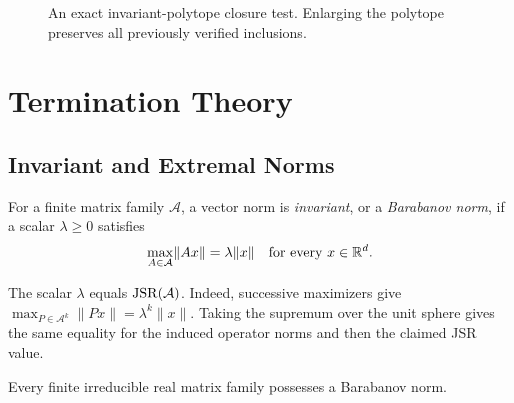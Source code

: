 \begin{figure}[ht]
    \centering
    \caption{An exact invariant-polytope closure test.
    Enlarging the polytope preserves all previously verified inclusions.}
    \label{fig:invPolytopeWorkflow}
\end{figure}

\section{Termination Theory}
\label{sec:invExtremalNorms}

\subsection{Invariant and Extremal Norms}

\begin{definition}\citep{Barabanov1988LyapunovIndicatorDiscreteInclusions}
    \label{def:barabanovNorm}
    For a finite matrix family $\mathcal{A}$, a vector norm is \emph{invariant}, or a \emph{Barabanov norm}, if a scalar $\lambda\geq0$ satisfies
    \[
        \max_{A\in\mathcal{A}}\lVert Ax\rVert=\lambda\lVert x\rVert
        \quad\text{for every }x\in\mathbb{R}^d.
    \]
\end{definition}

The scalar $\lambda$ equals $\operatorname{JSR}(\mathcal{A})$.
Indeed, successive maximizers give $\max_{P\in\mathcal{A}^k}\lVert Px\rVert=\lambda^k\lVert x\rVert$.
Taking the supremum over the unit sphere gives the same equality for the induced operator norms and then the claimed JSR value.

\begin{theorem}\citep{Barabanov1988LyapunovIndicatorDiscreteInclusions}
    \label{thm:barabanovNormExistence}
    Every finite irreducible real matrix family possesses a Barabanov norm.
\end{theorem}

